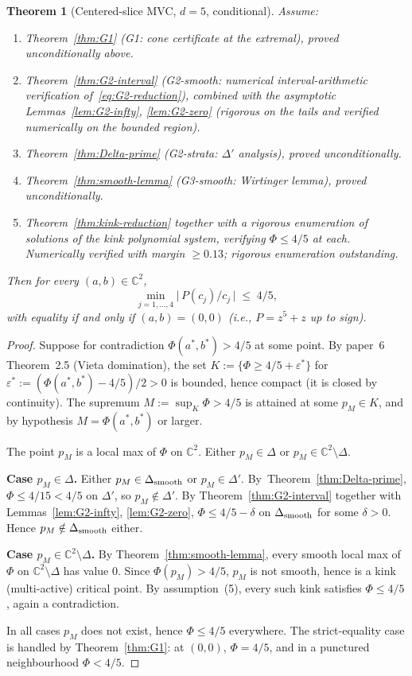 \documentclass[11pt,a4paper]{article}
\newtheorem{theorem}{Theorem}[section]
\begin{document}
\begin{theorem}[Centered-slice MVC, $d=5$, conditional]
\label{thm:main}
Assume:
\begin{enumerate}
\item Theorem~\ref{thm:G1} (G1: cone certificate at the extremal),
  proved unconditionally above.
\item Theorem~\ref{thm:G2-interval} (G2-smooth: numerical
  interval-arithmetic verification of~\eqref{eq:G2-reduction}),
  combined with the asymptotic Lemmas~\ref{lem:G2-infty},
  \ref{lem:G2-zero} (rigorous on the tails and verified numerically
  on the bounded region).
\item Theorem~\ref{thm:Delta-prime} (G2-strata: $\Delta'$ analysis), proved
  unconditionally.
\item Theorem~\ref{thm:smooth-lemma} (G3-smooth: Wirtinger lemma),
  proved unconditionally.
\item Theorem~\ref{thm:kink-reduction} together with a rigorous
  enumeration of solutions of the kink polynomial system, verifying
  $\Phi\le 4/5$ at each. Numerically verified with margin $\ge 0.13$;
  rigorous enumeration outstanding.
\end{enumerate}
Then for every $(a,b)\in\mathbb{C}^2$,
\[
\min_{j=1,\dots,4} \bigl|\,P(c_j)/c_j\,\bigr| \;\le\; 4/5,
\]
with equality if and only if $(a,b)=(0,0)$ (i.e., $P=z^5+z$ up to
sign).
\end{theorem}

\begin{proof}
Suppose for contradiction $\Phi(a^*,b^*) > 4/5$ at some point. By
paper~6 Theorem~2.5 (Vieta domination), the set
$K:=\{\Phi\ge 4/5+\varepsilon^*\}$ for $\varepsilon^* := (\Phi(a^*,b^*)-4/5)/2>0$
is bounded, hence compact (it is closed by continuity). The supremum
$M := \sup_K\Phi > 4/5$ is attained at some $p_M\in K$, and by
hypothesis $M = \Phi(a^*,b^*)$ or larger.

The point $p_M$ is a local max of $\Phi$ on $\mathbb{C}^2$. Either
$p_M\in\Delta$ or $p_M\in\mathbb{C}^2\setminus\Delta$.

\textbf{Case $p_M\in\Delta$.} Either $p_M\in\Delta_{\rm smooth}$ or
$p_M\in\Delta'$. By~Theorem~\ref{thm:Delta-prime}, $\Phi\le 4/15<4/5$
on $\Delta'$, so $p_M\notin\Delta'$. By
Theorem~\ref{thm:G2-interval} together with
Lemmas~\ref{lem:G2-infty}, \ref{lem:G2-zero},
$\Phi\le 4/5 - \delta$ on $\Delta_{\rm smooth}$ for some
$\delta>0$. Hence $p_M\notin\Delta_{\rm smooth}$ either.

\textbf{Case $p_M\in\mathbb{C}^2\setminus\Delta$.} By
Theorem~\ref{thm:smooth-lemma}, every smooth local max of $\Phi$ on
$\mathbb{C}^2\setminus\Delta$ has value $0$. Since $\Phi(p_M)>4/5$,
$p_M$ is not smooth, hence is a kink (multi-active) critical point.
By assumption~(5), every such kink satisfies $\Phi\le 4/5$, again a
contradiction.

In all cases $p_M$ does not exist, hence $\Phi\le 4/5$ everywhere.
The strict-equality case is handled by Theorem~\ref{thm:G1}: at
$(0,0)$, $\Phi=4/5$, and in a punctured neighbourhood $\Phi<4/5$.
\end{proof}
\end{document}

